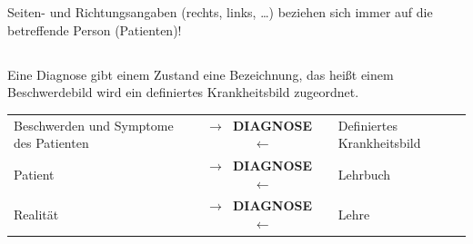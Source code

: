 \begin{Danger}
  \item Seiten- und Richtungsangaben (rechts, links, \ldots)
  beziehen sich immer auf die betreffende Person (Patienten)!
\end{Danger}

\subsection{} 

\Text
{{\TxBeschreibung}}%
{%
%
\label{topic:diagnose}%
Eine Diagnose gibt einem Zustand
eine Bezeichnung, das heißt einem Beschwerdebild wird ein
definiertes Krankheitsbild zugeordnet.

\begin{center}\TableBaseModification
\noindent\begin{tabularx}{\linewidth}{XcX}\toprule
Beschwerden und Symptome des Patienten
&
{\color{darkBlue}\sffamily\bfseries $\rightarrow$~DIAGNOSE~$\leftarrow$}
&
Definiertes Krankheitsbild
\\\addlinespace
Patient
&
{\color{darkBlue}\sffamily\bfseries $\rightarrow$~DIAGNOSE~$\leftarrow$}
&
Lehrbuch
\\\addlinespace
Realität
&
{\color{darkBlue}\sffamily\bfseries $\rightarrow$~DIAGNOSE~$\leftarrow$}
&
Lehre
\\\bottomrule
\end{tabularx}
\end{center}
}%


\begin{Synopsis}
\end{Synopsis}

